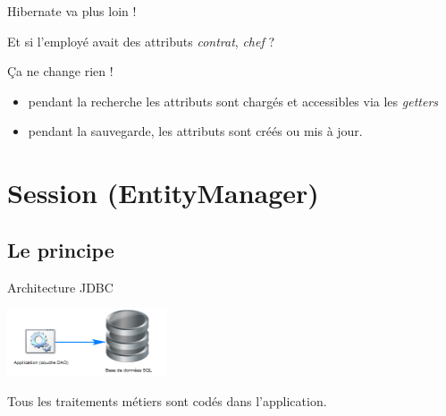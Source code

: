 \documentclass[compact]{beamer}%
\begin{document}
\begin{frame}{Hibernate va plus loin !}
	
	\begin{block}{}
	\center
	Et si l'employé avait des attributs \emph{contrat}, \emph{chef} ?
	\end{block}
	
	\pause
	Ça ne change rien !
	\begin{itemize}
	\item pendant la recherche les attributs sont chargés et accessibles via les \emph{getters}
	\item pendant la sauvegarde, les attributs sont créés ou mis à jour.
	\end{itemize}
	
\end{frame}
	
\section{Session (EntityManager)}

\subsection{Le principe}

\begin{frame}{Architecture JDBC}
	
	\begin{center}
	\includegraphics[height=2cm]{images/without_orm.png}	
	\end{center}
	
	\begin{block}{}
	\center
	Tous les traitements métiers sont codés dans l'application.
	\end{block}
\end{frame}
	
\end{document}
